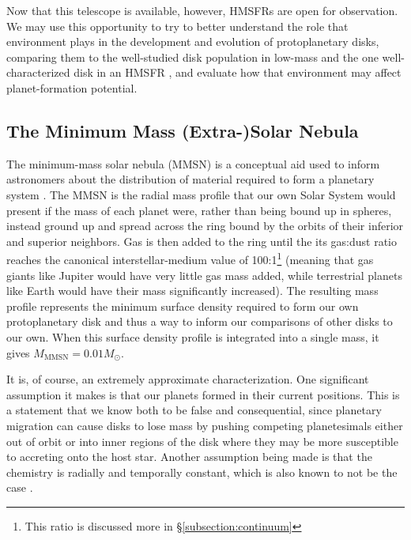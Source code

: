 Now that this telescope is available, however, HMSFRs are open for observation. We may use this opportunity to try to better understand the role that environment plays in the development and evolution of protoplanetary disks, comparing them to the well-studied disk population in low-mass \citep{AndrewsWilliams2005,Mann2015} and the one well-characterized disk in an HMSFR \citep{Factor2017}, and evaluate how that environment may affect planet-formation potential.



\subsection{The Minimum Mass (Extra-)Solar Nebula}

The minimum-mass solar nebula (MMSN) is a conceptual aid used to inform astronomers about the distribution of material required to form a planetary system \citep{Weidenschilling1977}. The MMSN is the radial mass profile that our own Solar System would present if the mass of each planet were, rather than being bound up in spheres, instead ground up and spread across the ring bound by the orbits of their inferior and superior neighbors. Gas is then added to the ring until the its gas:dust ratio reaches the canonical interstellar-medium value of 100:1\footnote{This ratio is discussed more in \S\ref{subsection:continuum}} (meaning that gas giants like Jupiter would have very little gas mass added, while terrestrial planets like Earth would have their mass significantly increased). The resulting mass profile represents the minimum surface density required to form our own protoplanetary disk and thus a way to inform our comparisons of other disks to our own. When this surface density profile is integrated into a single mass, it gives $M_\text{MMSN} = 0.01 M_{\odot}$.

It is, of course, an extremely approximate characterization. One significant assumption it makes is that our planets formed in their current positions. This is a statement that we know both to be false \citep{Walsh2011,Tsiganis2005} and consequential, since planetary migration can cause disks to lose mass by pushing competing planetesimals either out of orbit or into inner regions of the disk where they may be more susceptible to accreting onto the host star. Another assumption being made is that the chemistry is radially and temporally constant, which is also known to not be the case \citep{vanDishoeckBlake1998}.

